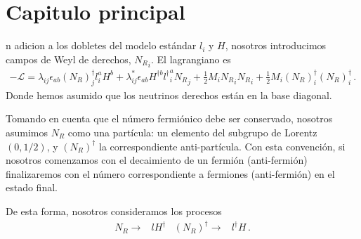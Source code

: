 \chapter{Capitulo principal}
%
n adicion a los dobletes del modelo estándar $l_i$ y $H$, nosotros introducimos campos de Weyl de derechos, ${N_R}_i$. El lagrangiano es 
%
\begin{align}
-\mathcal{L}=\lambda_{ij}\epsilon_{ab} \left( N_R \right)^\dagger_{j} l^a_iH^{b} +\lambda_{ij}^*\epsilon_{ab}   H^{\dagger b}{l^\dagger}^a_i {N_R}_j
+\frac{1}{2}M_i {N_R}_i {N_R}_i+\frac{1}{2}M_i \left( N_R\right)^\dagger_i 
\left( N_R\right)^\dagger_i\, .
\end{align}
%
Donde hemos asumido que los neutrinos derechos están en la base diagonal.

Tomando en cuenta que el número fermiónico debe ser conservado, nosotros asumimos $N_R$ como una partícula: un elemento del subgrupo de Lorentz $(0,1/2)$, y $\left( N_R \right)^{\dagger}$ la correspondiente anti-partícula.  Con esta convención, si nosotros comenzamos con el decaimiento de un fermión (anti-fermión) finalizaremos con el número correspondiente a fermiones (anti-fermión) en el estado final.
 
De esta forma, nosotros consideramos los procesos
\begin{align}
  N_R \to& l  H^\dagger &  \left( N_R \right)^{\dagger}\to& l^{\dagger} H\, . 
\end{align}

